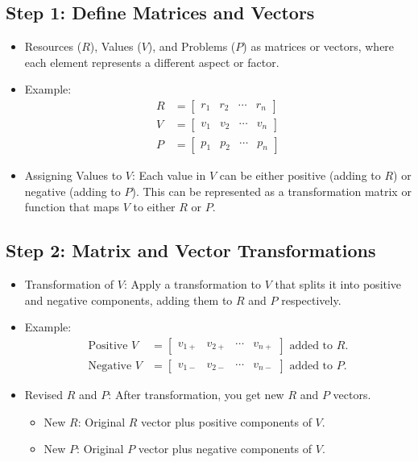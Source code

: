 \documentclass{article}
\begin{document}
\subsection*{Step 1: Define Matrices and Vectors}
\begin{itemize}
  \item Resources (\( R \)), Values (\( V \)), and Problems (\( P \)) as matrices or vectors, where each element represents a different aspect or factor.
  \item Example:
  \begin{align*}
    R &= \begin{bmatrix} r_1 & r_2 & \cdots & r_n \end{bmatrix} \\
    V &= \begin{bmatrix} v_1 & v_2 & \cdots & v_n \end{bmatrix} \\
    P &= \begin{bmatrix} p_1 & p_2 & \cdots & p_n \end{bmatrix}
  \end{align*}
  \item Assigning Values to \( V \): Each value in \( V \) can be either positive (adding to \( R \)) or negative (adding to \( P \)). This can be represented as a transformation matrix or function that maps \( V \) to either \( R \) or \( P \).
\end{itemize}

\subsection*{Step 2: Matrix and Vector Transformations}
\begin{itemize}
  \item Transformation of \( V \): Apply a transformation to \( V \) that splits it into positive and negative components, adding them to \( R \) and \( P \) respectively.
  \item Example:
  \begin{align*}
    \text{Positive } V &= \begin{bmatrix} v_{1+} & v_{2+} & \cdots & v_{n+} \end{bmatrix} \text{ added to } R. \\
    \text{Negative } V &= \begin{bmatrix} v_{1-} & v_{2-} & \cdots & v_{n-} \end{bmatrix} \text{ added to } P.
  \end{align*}
  \item Revised \( R \) and \( P \): After transformation, you get new \( R \) and \( P \) vectors.
  \begin{itemize}
    \item New \( R \): Original \( R \) vector plus positive components of \( V \).
    \item New \( P \): Original \( P \) vector plus negative components of \( V \).
  \end{itemize}
\end{itemize}
\end{document}
